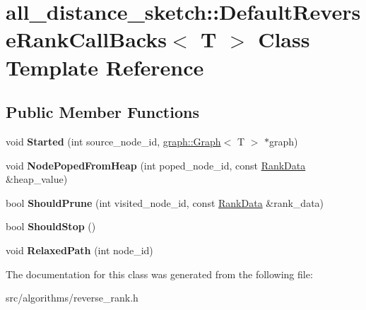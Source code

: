 \hypertarget{classall__distance__sketch_1_1DefaultReverseRankCallBacks}{}\section{all\+\_\+distance\+\_\+sketch\+:\+:Default\+Reverse\+Rank\+Call\+Backs$<$ T $>$ Class Template Reference}
\label{classall__distance__sketch_1_1DefaultReverseRankCallBacks}
\subsection*{Public Member Functions}
\begin{DoxyCompactItemize}
\item 
\hypertarget{classall__distance__sketch_1_1DefaultReverseRankCallBacks_a6125096eeeba5f3489c421ea51781dd4}{}void {\bfseries Started} (int source\+\_\+node\+\_\+id, \hyperlink{classall__distance__sketch_1_1graph_1_1Graph}{graph\+::\+Graph}$<$ T $>$ $\ast$graph)\label{classall__distance__sketch_1_1DefaultReverseRankCallBacks_a6125096eeeba5f3489c421ea51781dd4}

\item 
\hypertarget{classall__distance__sketch_1_1DefaultReverseRankCallBacks_a86d4b61136371feb1f49d1cf3ad80be4}{}void {\bfseries Node\+Poped\+From\+Heap} (int poped\+\_\+node\+\_\+id, const \hyperlink{structall__distance__sketch_1_1RankData}{Rank\+Data} \&heap\+\_\+value)\label{classall__distance__sketch_1_1DefaultReverseRankCallBacks_a86d4b61136371feb1f49d1cf3ad80be4}

\item 
\hypertarget{classall__distance__sketch_1_1DefaultReverseRankCallBacks_afb6f500355d617e6a243a2e28e929aa5}{}bool {\bfseries Should\+Prune} (int visited\+\_\+node\+\_\+id, const \hyperlink{structall__distance__sketch_1_1RankData}{Rank\+Data} \&rank\+\_\+data)\label{classall__distance__sketch_1_1DefaultReverseRankCallBacks_afb6f500355d617e6a243a2e28e929aa5}

\item 
\hypertarget{classall__distance__sketch_1_1DefaultReverseRankCallBacks_aff6ca83f992bb53a98604ea297c7e2aa}{}bool {\bfseries Should\+Stop} ()\label{classall__distance__sketch_1_1DefaultReverseRankCallBacks_aff6ca83f992bb53a98604ea297c7e2aa}

\item 
\hypertarget{classall__distance__sketch_1_1DefaultReverseRankCallBacks_a5d0a5d363fb72db3d338371332352a84}{}void {\bfseries Relaxed\+Path} (int node\+\_\+id)\label{classall__distance__sketch_1_1DefaultReverseRankCallBacks_a5d0a5d363fb72db3d338371332352a84}

\end{DoxyCompactItemize}


The documentation for this class was generated from the following file\+:\begin{DoxyCompactItemize}
\item 
src/algorithms/reverse\+\_\+rank.\+h\end{DoxyCompactItemize}
